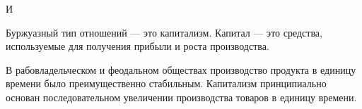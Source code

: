 И 

Буржуазный тип отношений --- это капитализм. 
Капитал --- это средства, используемые для получения прибыли и роста
производства. 

В рабовладельческом и феодальном обществах производство продукта в единицу времени было преимущественно стабильным. Капитализм принципиально основан
последовательном увеличении производства товаров в единицу времени. 



